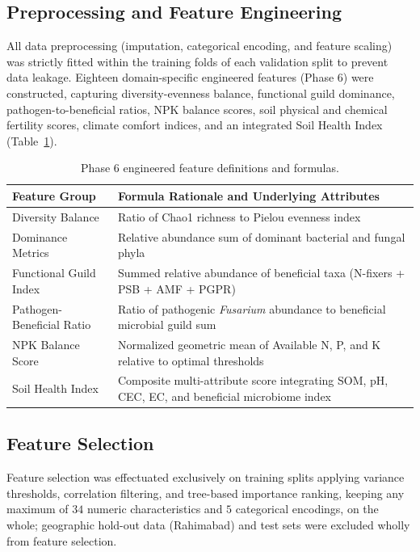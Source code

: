 \documentclass[runningheads,a4paper,oribibl]{llncs}
\begin{document}
\subsection{Preprocessing and Feature Engineering}
All data preprocessing (imputation, categorical encoding, and feature scaling) was strictly fitted within the training folds of each validation split to prevent data leakage. Eighteen domain-specific engineered features (Phase 6) were constructed, capturing diversity-evenness balance, functional guild dominance, pathogen-to-beneficial ratios, NPK balance scores, soil physical and chemical fertility scores, climate comfort indices, and an integrated Soil Health Index (Table~\ref{tab:eng_features}).

\begin{table}[t]
\caption{Phase 6 engineered feature definitions and formulas.}
\label{tab:eng_features}
\centering
\begin{tabular}{lp{7.2cm}}
\hline
Feature Group & Formula Rationale and Underlying Attributes \\
\hline
Diversity Balance & Ratio of Chao1 richness to Pielou evenness index \\
Dominance Metrics & Relative abundance sum of dominant bacterial and fungal phyla \\
Functional Guild Index & Summed relative abundance of beneficial taxa (N-fixers + PSB + AMF + PGPR) \\
Pathogen-Beneficial Ratio & Ratio of pathogenic \textit{Fusarium} abundance to beneficial microbial guild sum \\
NPK Balance Score & Normalized geometric mean of Available N, P, and K relative to optimal thresholds \\
Soil Health Index & Composite multi-attribute score integrating SOM, pH, CEC, EC, and beneficial microbiome index \\
\hline
\end{tabular}
\end{table}

\subsection{Feature Selection}
Feature selection was effectuated exclusively on training splits applying variance thresholds, correlation filtering, and tree-based importance ranking, keeping any maximum of $34$ numeric characteristics and $5$ categorical encodings, on the whole; geographic hold-out data (Rahimabad) and test sets were excluded wholly from feature selection.
\end{document}
